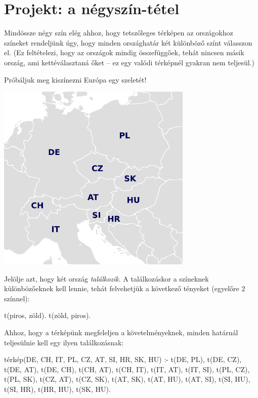 \clearpage

\section{Projekt: a négyszín-tétel}
Mindössze négy szín elég ahhoz, hogy tetszőleges
térképen az országokhoz színeket rendeljünk úgy,
hogy minden országhatár két különböző színt
válasszon el. (Ez feltételezi, hogy az országok
mindig összefüggőek, tehát nincsen másik ország, ami
kettéválasztaná őket -- ez egy valódi térképnél
gyakran nem teljesül.)

Próbáljuk meg kiszínezni Európa egy szeletét!

\begin{center}
  \includegraphics[width=0.7\textwidth]{images/europe.pdf}
\end{center}

Jelölje  azt, hogy két ország
\emph{találkozik}. A találkozáskor a színeknek
különbözőeknek kell lennie, tehát felvehetjük a
következő tényeket (egyelőre 2 színnel):
\begin{program}
t(piros, zöld). t(zöld, piros).
\end{program}
Ahhoz, hogy a térképünk megfeleljen a
követelményeknek, minden határnál teljesülnie kell
egy ilyen találkozásnak:
\begin{program}
térkép(DE, CH, IT, PL, CZ, AT, SI, HR, SK, HU) :-
    t(DE, PL), t(DE, CZ), t(DE, AT), t(DE, CH),
    t(CH, AT), t(CH, IT),
    t(IT, AT), t(IT, SI),
    t(PL, CZ), t(PL, SK),
    t(CZ, AT), t(CZ, SK),
    t(AT, SK), t(AT, HU), t(AT, SI),
    t(SI, HU), t(SI, HR),
    t(HR, HU),
    t(SK, HU).
\end{program}

